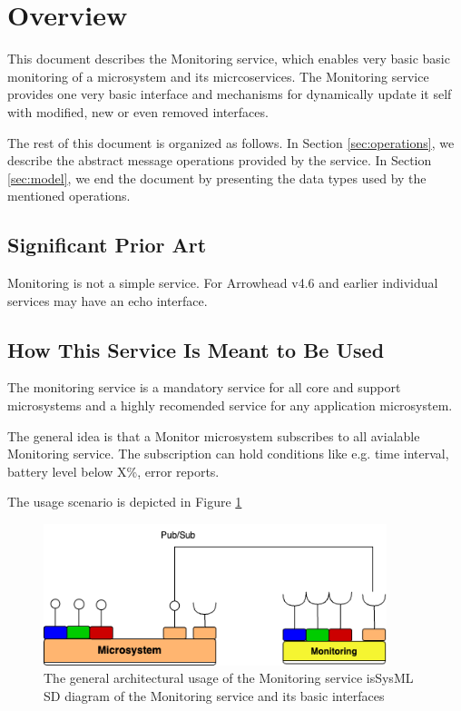 \documentclass[a4paper]{arrowhead}
\begin{document}
\newpage

\tableofcontents
\newpage

\section{Overview}
\label{sec:overview}

This document describes the Monitoring service, which enables very
basic basic monitoring of a microsystem and its micrcoservices. 
The Monitoring service provides one very basic interface
    and mechanisms for dynamically update it self with modified, new
    or even removed interfaces.

The rest of this document is organized as follows.
In Section \ref{sec:operations}, we describe the abstract message
operations provided by the service.
In Section \ref{sec:model}, we end the document by presenting the data types used by the mentioned operations.


\subsection{Significant Prior Art}

Monitoring is not a simple service. For Arrowhead v4.6 and earlier
individual services may have an echo interface.

\subsection{How This Service Is Meant to Be Used}

The monitoring service is a mandatory service for all core and support
microsystems and a highly recomended service for any application
microsystem.

The general idea is that a Monitor microsystem subscribes to all
avialable Monitoring service. The subscription can hold conditions
like e.g. time interval, battery level below X\%, error reports.

The usage scenario is depicted in Figure \ref{fig:Monitoring}

\begin{figure}[h!]
  \centering
  \includegraphics[width=10cm]{figures/Monitor_architecture}
  \caption{The general architectural usage of the Monitoring service isSysML SD diagram of the Monitoring service and its basic interfaces}
  \label{fig:Monitoring}
\end{figure}
\end{document}
